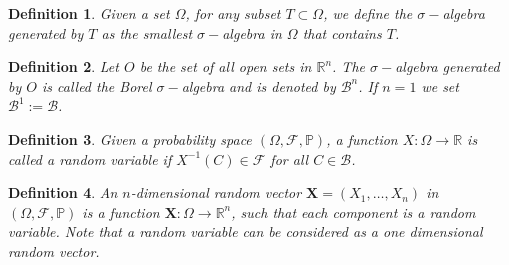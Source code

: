 \documentclass[12pt]{book}
\newtheorem{definition}{Definition}
\newcommand{\p}{\mathbb{P}}
\begin{document}
\begin{definition}
Given a set $\Omega$, for any subset $T\subset\Omega$, we define the $\sigma-$algebra generated by $T$ as
the smallest $\sigma-$algebra in $\Omega$ that contains $T$.
\end{definition}

\begin{definition}
Let $O$ be the set of all open sets in $\mathbb{R}^{n}$. The $\sigma-$algebra generated by $O$ is called
the Borel $\sigma-$algebra and is denoted by $\mathcal{B}^{n}$. If $n=1$ we set 
$\mathcal{B}^{1}:=\mathcal{B}$.
\end{definition}

\begin{definition}
Given a probability space $(\Omega,\mathscr{F},\p)$, a function $X:\Omega\rightarrow\mathbb{R}$ is called 
a random variable
if $X^{-1}(C)\in\mathscr{F}$ for all $C\in\mathcal{B}$.
\end{definition}

\begin{definition}
 An $n$-dimensional random vector $\textbf{X}=(X_{1},\ldots,X_{n})$ in $(\Omega,\mathscr{F},\p)$ 
is a function $\textbf{X}:\Omega\rightarrow\mathbb{R}^{n}$, such that each component is a random variable. 
Note that a random variable can be considered as a one dimensional random vector.
\end{definition}
\end{document}
